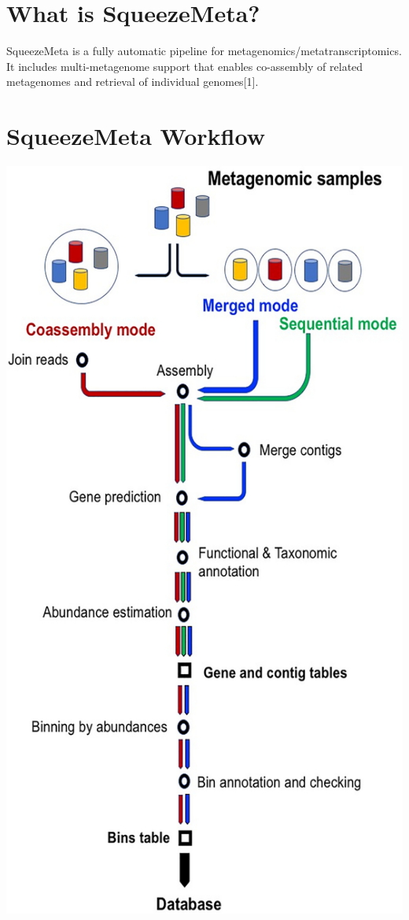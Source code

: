 \documentclass[
]{book}
\begin{document}
\hypertarget{what-is-squeezemeta}{%
\section{What is SqueezeMeta?}\label{what-is-squeezemeta}}

SqueezeMeta is a fully automatic pipeline for metagenomics/metatranscriptomics. It includes multi-metagenome support that enables co-assembly of related metagenomes and retrieval of individual genomes{[}1{]}.

\hypertarget{squeezemeta-workflow}{%
\section{SqueezeMeta Workflow}\label{squeezemeta-workflow}}

\includegraphics[width=1\textwidth,height=\textheight]{./Figures/SqueezeMeta_workflow.png}
\end{document}
